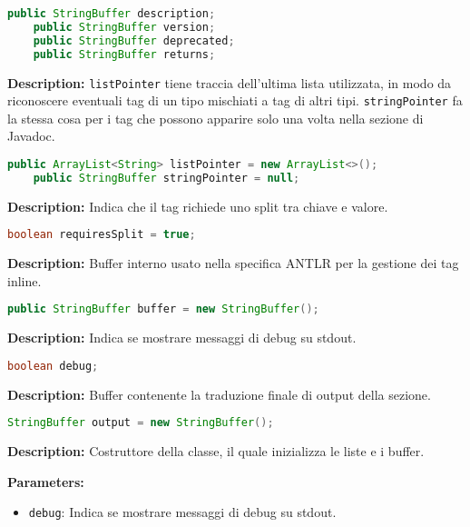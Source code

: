 \begin{lstlisting}[language=Java]
    public StringBuffer description;
    public StringBuffer version;
    public StringBuffer deprecated;
    public StringBuffer returns;
\end{lstlisting}
\vspace{0.5cm}
\textbf{Description:}  \texttt{listPointer} tiene traccia dell'ultima lista utilizzata, in modo da riconoscere eventuali tag di un tipo mischiati a tag di altri tipi. \texttt{stringPointer} fa la stessa cosa per i tag che possono apparire solo una volta nella sezione di Javadoc.

\begin{lstlisting}[language=Java]
    public ArrayList<String> listPointer = new ArrayList<>();
    public StringBuffer stringPointer = null;
\end{lstlisting}
\vspace{0.5cm}
\textbf{Description:} Indica che il tag richiede uno split tra chiave e valore.

\begin{lstlisting}[language=Java]
    boolean requiresSplit = true;
\end{lstlisting}
\vspace{0.5cm}
\textbf{Description:} Buffer interno usato nella specifica ANTLR per la gestione dei tag inline.

\begin{lstlisting}[language=Java]
    public StringBuffer buffer = new StringBuffer();
\end{lstlisting}
\vspace{0.5cm}
\textbf{Description:} Indica se mostrare messaggi di debug su stdout.

\begin{lstlisting}[language=Java]
    boolean debug;
\end{lstlisting}
\vspace{0.5cm}
\textbf{Description:} Buffer contenente la traduzione finale di output della sezione.

\begin{lstlisting}[language=Java]
    StringBuffer output = new StringBuffer();
\end{lstlisting}
\vspace{0.5cm}
\textbf{Description:}  Costruttore della classe, il quale inizializza le liste e i buffer.  

\textbf{Parameters:}
\begin{itemize}
  \item\texttt{debug}: Indica se mostrare messaggi di debug su stdout.
\end{itemize}

